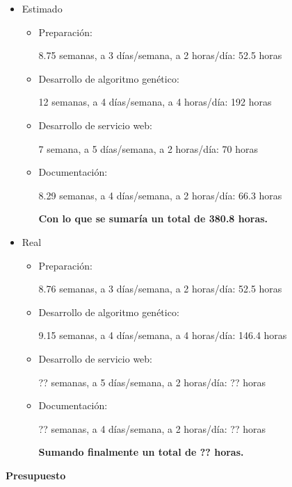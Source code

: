 \begin{itemize}
	
	\item Estimado
		\begin{itemize}
			\item Preparación: 
	
			8.75 semanas, a 3 días/semana, a 2 horas/día: 52.5 horas	
			
			\item Desarrollo de algoritmo genético: 
			
			12 semanas, a 4 días/semana, a 4 horas/día:  192 horas

			\item Desarrollo de servicio web: 
			
			7 semana, a 5 días/semana, a 2 horas/día: 70 horas
			
			\item Documentación: 
			
			8.29 semanas, a 4 días/semana, a 2 horas/día: 66.3 horas
			
			\bigskip			
			\textbf{Con lo que se sumaría un total de 380.8 horas.}
			
		\end{itemize}
	
	\item Real
		\begin{itemize}
			\item Preparación: 
			
			8.76 semanas, a  3 días/semana, a  2 horas/día:  52.5 horas
			
			\item Desarrollo de algoritmo genético: 
			
			9.15 semanas, a 4 días/semana, a 4 horas/día: 146.4 horas
			
			\item Desarrollo de servicio web: 
			
			?? semanas, a 5 días/semana, a 2 horas/día:  ?? horas
			
			\item Documentación: 
			
			?? semanas, a 4 días/semana, a 2 horas/día: ?? horas
			
			\bigskip			
			\textbf{Sumando finalmente un total de ?? horas.}

		\end{itemize}
		
\end{itemize}

\bigskip
\textbf{Presupuesto}

